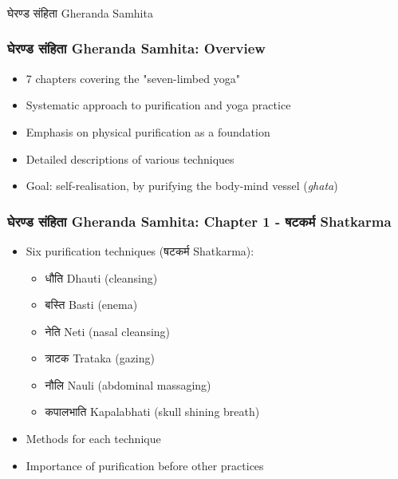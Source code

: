 \begin{frame}[fragile]\frametitle{}
\begin{center}
{\Large घेरण्ड संहिता  Gheranda Samhita}
\end{center}
\end{frame}



\begin{frame}[fragile]\frametitle{घेरण्ड संहिता  Gheranda Samhita: Overview}
\begin{itemize}
    \item 7 chapters covering the "seven-limbed yoga"
    \item Systematic approach to purification and yoga practice
    \item Emphasis on physical purification as a foundation
    \item Detailed descriptions of various techniques
    \item Goal: self-realisation, by purifying the body-mind vessel (\textit{ghata})
\end{itemize}
\end{frame}

\begin{frame}[fragile]\frametitle{घेरण्ड संहिता Gheranda Samhita: Chapter 1 - षटकर्म  Shatkarma}
\begin{itemize}
    \item Six purification techniques (षटकर्म  Shatkarma):
    \begin{itemize}
        \item धौति  Dhauti (cleansing)
        \item बस्ति  Basti (enema)
        \item नेति  Neti (nasal cleansing)
        \item त्राटक  Trataka (gazing)
        \item नौलि Nauli (abdominal massaging)
        \item कपालभाति  Kapalabhati (skull shining breath)
    \end{itemize}
    \item Methods for each technique
    \item Importance of purification before other practices
\end{itemize}
\end{frame}

